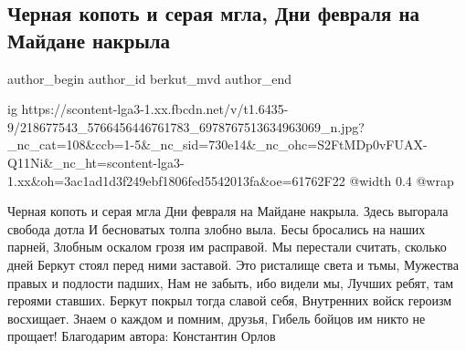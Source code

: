  
 
 
 
 
 
\subsection{Черная копоть и серая мгла, Дни февраля на Майдане накрыла}
\label{sec:20_07_2021.fb.berkut_mvd.1.maidan2}
 
\ifcmt
 author_begin
   author_id berkut_mvd
 author_end
\fi

\ifcmt
  ig https://scontent-lga3-1.xx.fbcdn.net/v/t1.6435-9/218677543_5766456446761783_6978767513634963069_n.jpg?_nc_cat=108&ccb=1-5&_nc_sid=730e14&_nc_ohc=S2FtMDp0vFUAX-Q11Ni&_nc_ht=scontent-lga3-1.xx&oh=3ac1ad1d3f249ebf1806fed5542013fa&oe=61762F22
  @width 0.4
  @wrap 
\fi

Черная копоть и серая мгла
Дни февраля на Майдане накрыла.
Здесь выгорала свобода дотла
И бесноватых толпа злобно выла.
Бесы бросались на наших парней,
Злобным оскалом грозя им расправой.
Мы перестали считать, сколько дней
Беркут стоял перед ними заставой.
Это ристалище света и тьмы,
Мужества правых и подлости падших,
Нам не забыть, ибо видели мы,
Лучших ребят, там героями ставших.
Беркут покрыл тогда славой себя,
Внутренних войск героизм восхищает.
Знаем о каждом и помним, друзья,
Гибель бойцов им никто не прощает!
Благодарим автора: Константин Орлов
